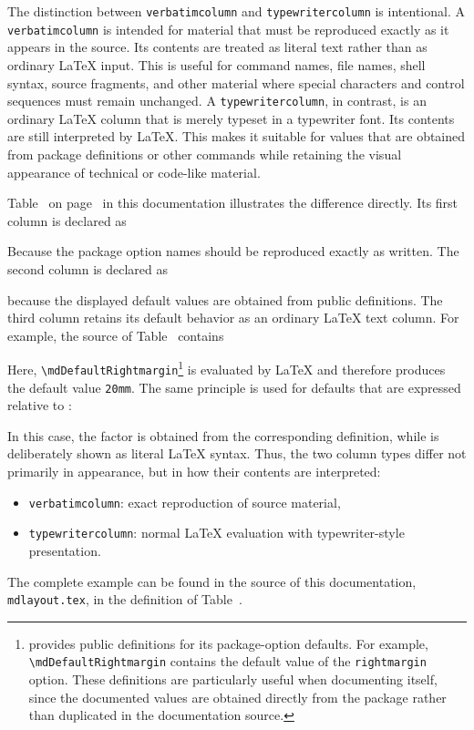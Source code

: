 \documentclass[
11pt,
a4paper,
oneside
]{scrbook}
\begin{document}
The distinction between \texttt{verbatimcolumn} and
\texttt{typewritercolumn} is intentional.
A \texttt{verbatimcolumn} is intended for material that must be
reproduced exactly as it appears in the source. Its contents are treated
as literal text rather than as ordinary \LaTeX{} input. This is useful
for command names, file names, shell syntax, source fragments, and other
material where special characters and control sequences must remain
unchanged.
A \texttt{typewritercolumn}, in contrast, is an ordinary \LaTeX{}
column that is merely typeset in a typewriter font. Its contents are
still interpreted by \LaTeX{}. This makes it suitable for values that
are obtained from package definitions or other commands while retaining
the visual appearance of technical or code-like material.

Table~ on page~
in this documentation illustrates the difference directly. 
Its first column is declared as




Because the package option names should be reproduced exactly as written.
The second column is declared as




because the displayed default values are obtained from public
\MDWordmark definitions. The third column retains its default behavior as an ordinary
\LaTeX{} text column. For example, the source of
Table~ contains




Here, \texttt{\textbackslash{}mdDefaultRightmargin}\footnote{%
	\MDWordmark provides public definitions for its package-option
	defaults. For example, \texttt{\textbackslash{}mdDefaultRightmargin}
	contains the default value of the \texttt{rightmargin} option.
	These definitions are particularly useful when documenting
	\MDWordmark itself, since the documented values are obtained
	directly from the package rather than duplicated in the
	documentation source.%
}
is evaluated by \LaTeX{} and therefore produces the default value
\texttt{20mm}.
The same principle is used for defaults that are expressed relative to
:




In this case, the factor is obtained from the corresponding
\MDWordmark definition, while  is deliberately
shown as literal \LaTeX{} syntax.
Thus, the two column types differ not primarily in appearance, but in
how their contents are interpreted:
\begin{itemize}
	\item \texttt{verbatimcolumn}: exact reproduction of source material,
	\item \texttt{typewritercolumn}: normal \LaTeX{} evaluation with
	typewriter-style presentation.
\end{itemize}
The complete example can be found in the source of this documentation,
\texttt{mdlayout.tex}, in the definition of
Table~.
\end{document}
